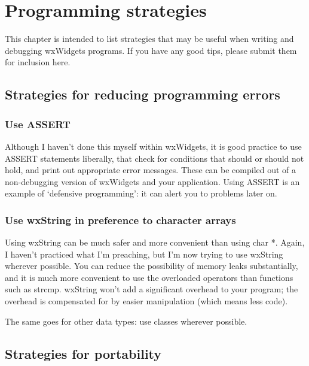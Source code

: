 \chapter{Programming strategies}\label{strategies}
%
\setfooter{\thepage}{}{}{}{}{\thepage}%

This chapter is intended to list strategies that may be useful when
writing and debugging wxWidgets programs. If you have any good tips,
please submit them for inclusion here.

\section{Strategies for reducing programming errors}

\subsection{Use ASSERT}

Although I haven't done this myself within wxWidgets, it is good
practice to use ASSERT statements liberally, that check for conditions that
should or should not hold, and print out appropriate error messages.
These can be compiled out of a non-debugging version of wxWidgets
and your application. Using ASSERT is an example of `defensive programming':
it can alert you to problems later on.

\subsection{Use wxString in preference to character arrays}

Using wxString can be much safer and more convenient than using char *.
Again, I haven't practiced what I'm preaching, but I'm now trying to use
wxString wherever possible. You can reduce the possibility of memory
leaks substantially, and it is much more convenient to use the overloaded
operators than functions such as strcmp. wxString won't add a significant
overhead to your program; the overhead is compensated for by easier
manipulation (which means less code).

The same goes for other data types: use classes wherever possible.

\section{Strategies for portability}


